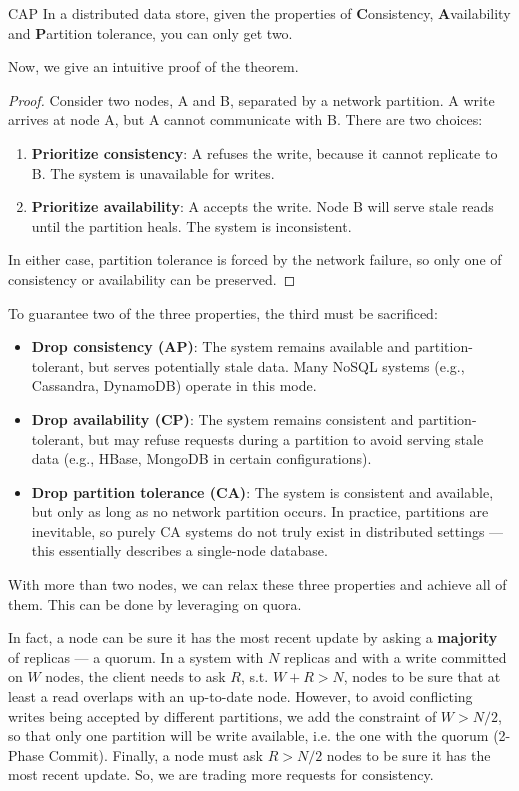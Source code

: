\begin{theorem}[label=thm:cap]{CAP}
In a distributed data store, given the properties of \textbf{C}onsistency, \textbf{A}vailability and \textbf{P}artition tolerance, you can only get two.
\end{theorem}
Now, we give an intuitive proof of the theorem.

\begin{proof}
    Consider two nodes, A and B, separated by a network partition. A write arrives at node A, but A cannot communicate with B. There are two choices:
    \begin{enumerate}
        \item \textbf{Prioritize consistency}: A refuses the write, because it cannot replicate to B. The system is unavailable for writes.
        \item \textbf{Prioritize availability}: A accepts the write. Node B will serve stale reads until the partition heals. The system is inconsistent.
    \end{enumerate}
    In either case, partition tolerance is forced by the network failure, so only one of consistency or availability can be preserved.
\end{proof}

To guarantee two of the three properties, the third must be sacrificed:
\begin{itemize}
    \item \textbf{Drop consistency (AP)}: The system remains available and partition-tolerant, but serves potentially stale data. Many NoSQL systems (e.g., Cassandra, DynamoDB) operate in this mode.
    \item \textbf{Drop availability (CP)}: The system remains consistent and partition-tolerant, but may refuse requests during a partition to avoid serving stale data (e.g., HBase, MongoDB in certain configurations).
    \item \textbf{Drop partition tolerance (CA)}: The system is consistent and available, but only as long as no network partition occurs. In practice, partitions are inevitable, so purely CA systems do not truly exist in distributed settings --- this essentially describes a single-node database.
\end{itemize}

With more than two nodes, we can relax these three properties and achieve all of them. This can be done by leveraging on quora.

In fact, a node can be sure it has the most recent update by asking a \textbf{majority} of replicas --- a quorum. 
In a system with \(N\) replicas and with a write committed on \(W\) nodes, the client needs to ask \(R\), s.t. \(W + R > N\), nodes to be sure that at least a read overlaps with an up-to-date node. 
However, to avoid conflicting writes being accepted by different partitions, we add the constraint of \(W > N/2\), so that only one partition will be write available, i.e. the one with the quorum (2-Phase Commit). 
Finally, a node must ask \(R > N/2\) nodes to be sure it has the most recent update.
So, we are trading more requests for consistency.

